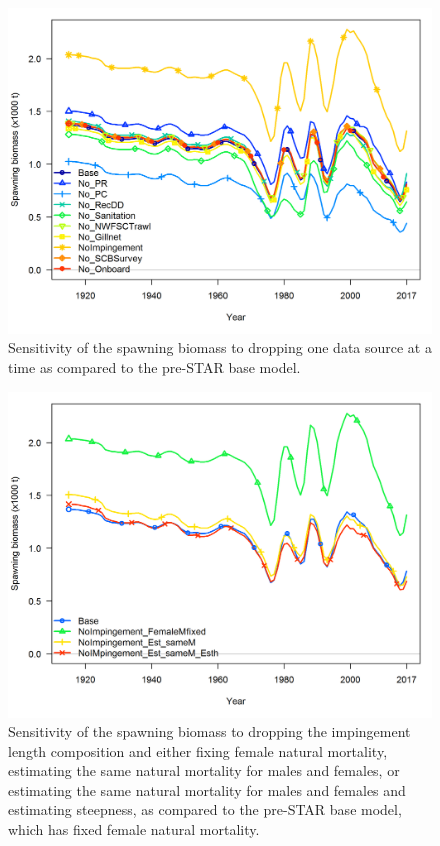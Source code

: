 \documentclass[12pt,]{article}
\begin{document}
\begin{figure}[htbp]
\centering
\includegraphics{Figures/sensitivity1_spawnbio.png}
\caption{Sensitivity of the spawning biomass to dropping one data source
at a time as compared to the pre-STAR base model.
\label{fig:sensitivity1_spawnbio}}
\end{figure}

\begin{figure}[htbp]
\centering
\includegraphics{Figures/sensitivity2_spawnbio.png}
\caption{Sensitivity of the spawning biomass to dropping the impingement
length composition and either fixing female natural mortality,
estimating the same natural mortality for males and females, or
estimating the same natural mortality for males and females and
estimating steepness, as compared to the pre-STAR base model, which has
fixed female natural mortality. \label{fig:sensitivity2_spawnbio}}
\end{figure}
\end{document}
